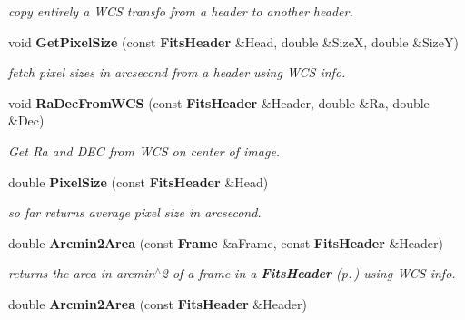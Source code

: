 \begin{CompactItemize}
\begin{CompactList}\small\item\em copy entirely a WCS transfo from a header to another header.\item\end{CompactList}\item 
{}
void {\bf Get\-Pixel\-Size} (const {\bf Fits\-Header} \&Head, double \&Size\-X, double \&Size\-Y)\label{wcsutils_h_a14}

\begin{CompactList}\small\item\em fetch pixel sizes in arcsecond from a header using WCS info.\item\end{CompactList}\item 
{}
void {\bf Ra\-Dec\-From\-WCS} (const {\bf Fits\-Header} \&Header, double \&Ra, double \&Dec)\label{wcsutils_h_a15}

\begin{CompactList}\small\item\em Get Ra and DEC from WCS on center of image.\item\end{CompactList}\item 
{}
double {\bf Pixel\-Size} (const {\bf Fits\-Header} \&Head)\label{wcsutils_h_a16}

\begin{CompactList}\small\item\em so far returns average pixel size in arcsecond.\item\end{CompactList}\item 
{}
double {\bf Arcmin2Area} (const {\bf Frame} \&a\-Frame, const {\bf Fits\-Header} \&Header)\label{wcsutils_h_a17}

\begin{CompactList}\small\item\em returns the area in arcmin$^\wedge$2 of a frame in a {\bf Fits\-Header} {\rm (p.\,\pageref{class_fitsheader})} using WCS info.\item\end{CompactList}\item 
{}
double {\bf Arcmin2Area} (const {\bf Fits\-Header} \&Header)\label{wcsutils_h_a18}


\end{CompactItemize}
